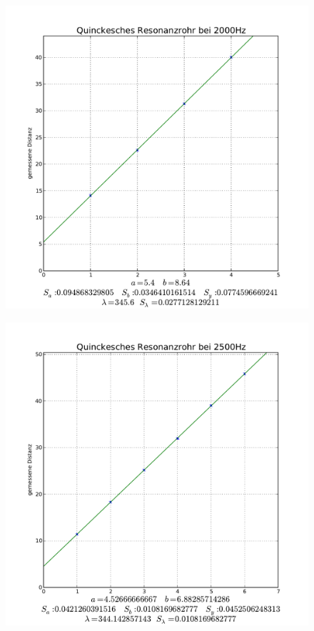 \documentclass[12pt,a4paper]{article}
\begin{document}
\begin{figure}[hbt]
	\centering
	\includegraphics[width=15cm]{2000Hz}
	\label{Bild1}
\end{figure}
\begin{figure}[hbt]
	\centering
	\includegraphics[width=15cm]{2500Hz}
	\label{Bild2}
\end{figure}
\end{document}
